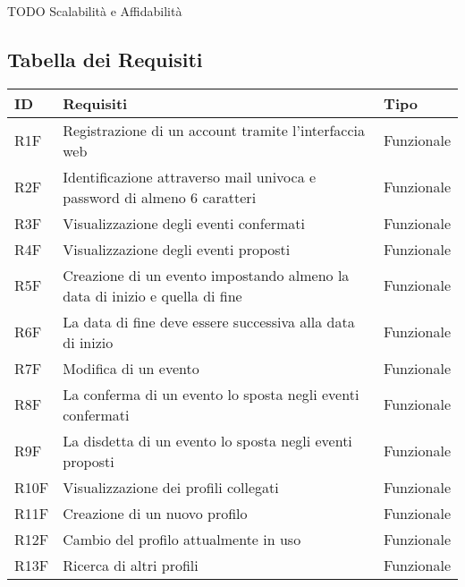 TODO Scalabilità e Affidabilità


\subsection{Tabella dei Requisiti}

\begin{tabular} {|P{1.5cm}|P{12.5cm}|P{3cm}|}
  \hline
  \textbf{ID} & \textbf{Requisiti}                                                          & \textbf{Tipo}  \\
  \hline
  R1F         & Registrazione di un account tramite l’interfaccia web                       & Funzionale     \\
  \hline
  R2F         & Identificazione attraverso mail univoca e password di almeno 6 caratteri    & Funzionale     \\
  \hline
  R3F         & Visualizzazione degli eventi confermati                                     & Funzionale     \\
  \hline
  R4F         & Visualizzazione degli eventi proposti                                       & Funzionale     \\
  \hline
  R5F         & Creazione di un evento impostando almeno la data di inizio e quella di fine & Funzionale     \\
  \hline
  R6F         & La data di fine deve essere successiva alla data di inizio                  & Funzionale     \\
  \hline
  R7F         & Modifica di un evento                                                       & Funzionale     \\
  \hline
  R8F         & La conferma di un evento lo sposta negli eventi confermati                  & Funzionale     \\
  \hline
  R9F         & La disdetta di un evento lo sposta negli eventi proposti                    & Funzionale     \\
  \hline
  R10F        & Visualizzazione dei profili collegati                                       & Funzionale     \\
  \hline
  R11F        & Creazione di un nuovo profilo                                               & Funzionale     \\
  \hline
  R12F        & Cambio del profilo attualmente in uso                                       & Funzionale     \\
  \hline
  R13F        & Ricerca di altri profili                                                    & Funzionale     \\

\end{tabular}
